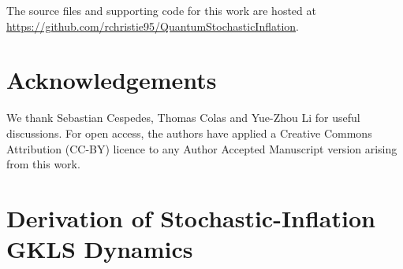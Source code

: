 \documentclass{article}
\numberwithin{equation}{section}
\begin{document}
	The source files and supporting code for this work are hosted at \url{https://github.com/rchristie95/QuantumStochasticInflation}.

	\section{Acknowledgements}

	We thank Sebastian Cespedes, Thomas Colas and Yue-Zhou Li for useful discussions.	For open access, the authors have applied a Creative Commons Attribution (CC-BY) licence to any Author Accepted Manuscript version arising from this work.

	  \newpage \appendix
	\section{Derivation of Stochastic-Inflation GKLS Dynamics}
	\label{app:bulk_boundary_derivation}
\end{document}
